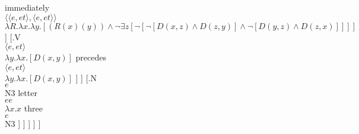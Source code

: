 \documentclass{article}
\begin{document}
{immediately\\$\langle \langle e,et\rangle ,\langle e,et\rangle \rangle $\\
$\lambda R.\lambda x.\lambda y.[(R(x) (y)) \land \lnot\exists z [\lnot[\lnot[D(x,z) \land D(z,y)] \land \lnot[D(y,z) \land D(z,x)]]]]$
 } ]  
[.{V\\
$\langle e,et\rangle $
\\
$\lambda y.\lambda x.[D(x,y)]$
}  
{precedes\\$\langle e,et\rangle $\\
$\lambda y.\lambda x.[D(x,y)]$
 } ]  ]  
[.{N\\
$e$
\\
$\mbox{N3}$
}  
{letter\\$ee$\\
$\lambda x.x$
 } 
{three\\$e$\\
$\mbox{N3}$
 } ]  ]  ]  ]  ] 
\end{document}
